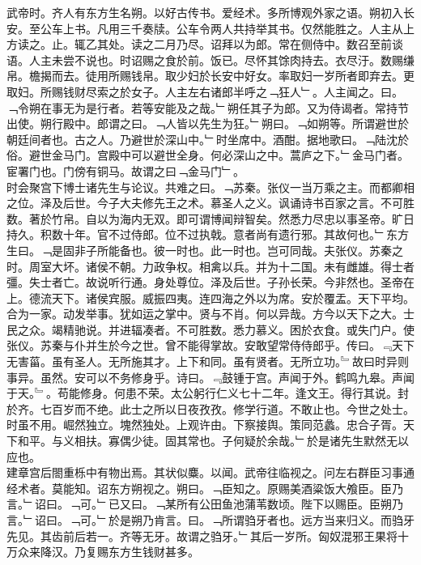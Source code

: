 \documentclass{zhvt-classic}
\begin{document}
\hspace*{2em}武帝时。齐人有东方生名朔。以好古传书。爱经术。多所博观外家之语。朔初入长安。至公车上书。凡用三千奏牍。公车令两人共持举其书。仅然能胜之。人主从上方读之。止。辄乙其处。读之二月乃尽。诏拜以为郎。常在侧侍中。数召至前谈语。人主未尝不说也。时诏赐之食於前。饭已。尽怀其馀肉持去。衣尽汙。数赐缣帛。檐揭而去。徒用所赐钱帛。取少妇於长安中好女。率取妇一岁所者即弃去。更取妇。所赐钱财尽索之於女子。人主左右诸郎半呼之﹁狂人﹂。人主闻之。曰。﹁令朔在事无为是行者。若等安能及之哉。﹂朔任其子为郎。又为侍谒者。常持节出使。朔行殿中。郎谓之曰。﹁人皆以先生为狂。﹂朔曰。﹁如朔等。所谓避世於朝廷间者也。古之人。乃避世於深山中。﹂时坐席中。酒酣。据地歌曰。﹁陆沈於俗。避世金马门。宫殿中可以避世全身。何必深山之中。蒿庐之下。﹂金马门者。宦署门也。门傍有铜马。故谓之曰﹁金马门﹂。\\
\hspace*{2em}时会聚宫下博士诸先生与论议。共难之曰。﹁苏秦。张仪一当万乘之主。而都卿相之位。泽及后世。今子大夫修先王之术。慕圣人之义。讽诵诗书百家之言。不可胜数。著於竹帛。自以为海内无双。即可谓博闻辩智矣。然悉力尽忠以事圣帝。旷日持久。积数十年。官不过侍郎。位不过执戟。意者尚有遗行邪。其故何也。﹂东方生曰。﹁是固非子所能备也。彼一时也。此一时也。岂可同哉。夫张仪。苏秦之时。周室大坏。诸侯不朝。力政争权。相禽以兵。并为十二国。未有雌雄。得士者彊。失士者亡。故说听行通。身处尊位。泽及后世。子孙长荣。今非然也。圣帝在上。德流天下。诸侯宾服。威振四夷。连四海之外以为席。安於覆盂。天下平均。合为一家。动发举事。犹如运之掌中。贤与不肖。何以异哉。方今以天下之大。士民之众。竭精驰说。并进辐凑者。不可胜数。悉力慕义。困於衣食。或失门户。使张仪。苏秦与仆并生於今之世。曾不能得掌故。安敢望常侍侍郎乎。传曰。﹃天下无害菑。虽有圣人。无所施其才。上下和同。虽有贤者。无所立功。﹄故曰时异则事异。虽然。安可以不务修身乎。诗曰。﹃鼓锺于宫。声闻于外。鹤鸣九皋。声闻于天。﹄。苟能修身。何患不荣。太公躬行仁义七十二年。逢文王。得行其说。封於齐。七百岁而不绝。此士之所以日夜孜孜。修学行道。不敢止也。今世之处士。时虽不用。崛然独立。塊然独处。上观许由。下察接舆。策同范蠡。忠合子胥。天下和平。与义相扶。寡偶少徒。固其常也。子何疑於余哉。﹂於是诸先生默然无以应也。\\
\hspace*{2em}建章宫后閤重栎中有物出焉。其状似麋。以闻。武帝往临视之。问左右群臣习事通经术者。莫能知。诏东方朔视之。朔曰。﹁臣知之。原赐美酒粱饭大飧臣。臣乃言。﹂诏曰。﹁可。﹂已又曰。﹁某所有公田鱼池蒲苇数顷。陛下以赐臣。臣朔乃言。﹂诏曰。﹁可。﹂於是朔乃肯言。曰。﹁所谓驺牙者也。远方当来归义。而驺牙先见。其齿前后若一。齐等无牙。故谓之驺牙。﹂其后一岁所。匈奴混邪王果将十万众来降汉。乃复赐东方生钱财甚多。\\
\end{document}
